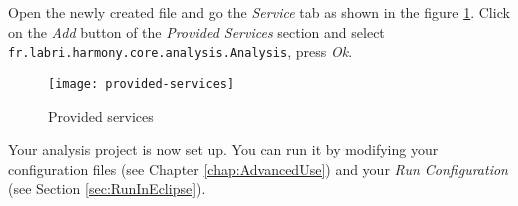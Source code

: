 Open the newly created file and go the \emph{Service} tab as shown in the figure \ref{fig:provided-services}. Click on the \emph{Add} button of the \emph{Provided Services} section and select \texttt{fr.labri.harmony.core.analysis.Analysis}, press \emph{Ok}.
	
	\begin{figure}[H]
		\centering
		\texttt{[image: provided-services]}
		\caption{Provided services}
		\label{fig:provided-services}
	\end{figure}
	
Your analysis project is now set up. You can run it by modifying your configuration files (see Chapter \ref{chap:AdvancedUse}) and your \emph{Run Configuration} (see Section \ref{sec:RunInEclipse}).

%
%
%	
%	
%	
	
%
%
%




